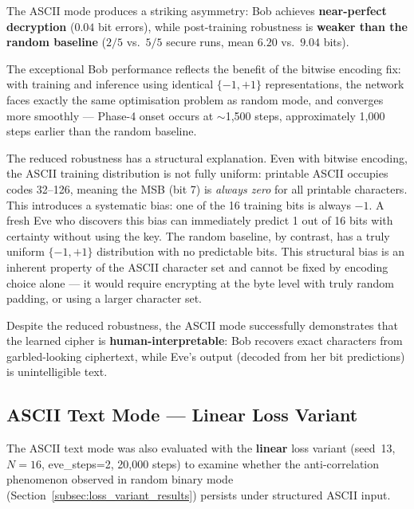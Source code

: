 \documentclass[12pt, a4paper]{article}
\begin{document}
The ASCII mode produces a striking asymmetry: Bob achieves
\textbf{near-perfect decryption} ($0.04$ bit errors), while post-training
robustness is \textbf{weaker than the random baseline} ($2/5$ vs.\ $5/5$
secure runs, mean $6.20$ vs.\ $9.04$ bits).

The exceptional Bob performance reflects the benefit of the bitwise
encoding fix: with training and inference using identical $\{-1,+1\}$
representations, the network faces exactly the same optimisation
problem as random mode, and converges more smoothly --- Phase-4 onset
occurs at $\sim$1{,}500 steps, approximately 1{,}000 steps earlier than the
random baseline.

The reduced robustness has a structural explanation. Even with
bitwise encoding, the ASCII training distribution is not fully uniform:
printable ASCII occupies codes 32--126, meaning the MSB (bit 7) is
\emph{always zero} for all printable characters. This introduces a
systematic bias: one of the 16 training bits is always $-1$. A fresh
Eve who discovers this bias can immediately predict 1 out of 16 bits
with certainty without using the key. The random baseline, by contrast,
has a truly uniform $\{-1,+1\}$ distribution with no predictable bits.
This structural bias is an inherent property of the ASCII character set
and cannot be fixed by encoding choice alone --- it would require
encrypting at the byte level with truly random padding, or using a
larger character set.

Despite the reduced robustness, the ASCII mode successfully
demonstrates that the learned cipher is \textbf{human-interpretable}:
Bob recovers exact characters from garbled-looking ciphertext, while
Eve's output (decoded from her bit predictions) is unintelligible text.
\subsection{ASCII Text Mode --- Linear Loss Variant}
\label{subsec:ascii_linear_results}

The ASCII text mode was also evaluated with the \textbf{linear} loss variant
(seed~13, $N=16$, eve\_steps=2, 20{,}000 steps) to examine whether the
anti-correlation phenomenon observed in random binary mode (Section~\ref{subsec:loss_variant_results})
persists under structured ASCII input.
\end{document}
